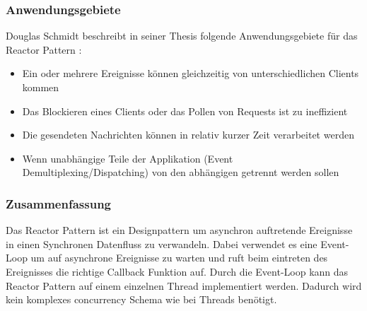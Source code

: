 \subsubsection{Anwendungsgebiete}

Douglas Schmidt beschreibt in seiner Thesis folgende Anwendungsgebiete für das Reactor Pattern \cite[p. 4]{Sch95}:

\begin{itemize}
  \item Ein oder mehrere Ereignisse können gleichzeitig von unterschiedlichen Clients kommen
  \item Das Blockieren eines Clients oder das Pollen von Requests ist zu ineffizient
  \item Die gesendeten Nachrichten können in relativ kurzer Zeit verarbeitet werden
  \item Wenn unabhängige Teile der Applikation (Event Demultiplexing/Dispatching) von den abhängigen getrennt werden sollen
\end{itemize}

\subsubsection{Zusammenfassung}

Das Reactor Pattern ist ein Designpattern um asynchron auftretende Ereignisse in einen Synchronen Datenfluss zu verwandeln. Dabei verwendet es eine Event-Loop um auf asynchrone Ereignisse zu warten und ruft beim eintreten des Ereignisses die richtige Callback Funktion auf. Durch die Event-Loop kann das Reactor Pattern auf einem einzelnen Thread implementiert werden. Dadurch wird kein komplexes concurrency Schema wie bei Threads benötigt.